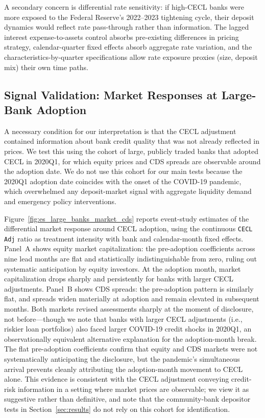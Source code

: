 A secondary concern is differential rate sensitivity: if high-CECL banks were
more exposed to the Federal Reserve's 2022--2023 tightening cycle, their
deposit dynamics would reflect rate pass-through rather than information.
The lagged interest expense-to-assets control absorbs pre-existing
differences in pricing strategy, calendar-quarter fixed effects absorb
aggregate rate variation, and the characteristics-by-quarter specifications
allow rate exposure proxies (size, deposit mix) their own time paths.

\subsection{Signal Validation: Market Responses at Large-Bank Adoption}
\label{sec:identification:signal}

A necessary condition for our interpretation is that the CECL adjustment
contained information about bank credit quality that was not already reflected
in prices.  We test this using the cohort of large, publicly traded banks that
adopted CECL in 2020Q1, for which equity prices and CDS spreads are observable
around the adoption date.  We do not use this cohort for
our main tests because the 2020Q1 adoption date coincides with the onset of
the COVID-19 pandemic, which overwhelmed any deposit-market signal with
aggregate liquidity demand and emergency policy interventions.

Figure~\ref{fig:es_large_banks_market_cds} reports event-study estimates of
the differential market response around CECL adoption, using the continuous
\texttt{CECL Adj} ratio as treatment intensity with bank and
calendar-month fixed effects.  Panel~A shows equity market capitalization:
the pre-adoption coefficients across nine lead months are flat and
statistically indistinguishable from zero, ruling out systematic anticipation
by equity investors.  At the adoption month, market capitalization drops
sharply and persistently for banks with larger CECL adjustments.  Panel~B
shows CDS spreads: the pre-adoption pattern is similarly flat, and spreads
widen materially at adoption and remain elevated in subsequent months.
Both markets revised assessments sharply at the moment of disclosure, not
before---though we note that banks with larger CECL adjustments (i.e.,
riskier loan portfolios) also faced larger COVID-19 credit shocks in 2020Q1,
an observationally equivalent alternative explanation for the adoption-month
break.  The flat pre-adoption coefficients confirm that equity and CDS markets
were not systematically anticipating the disclosure, but the pandemic's
simultaneous arrival prevents cleanly attributing the adoption-month movement
to CECL alone.  This evidence is consistent with the CECL adjustment conveying
credit-risk information in a setting where market prices are observable; we
view it as suggestive rather than definitive, and note that the
community-bank depositor tests in Section~\ref{sec:results} do not rely on
this cohort for identification.
